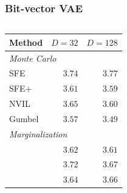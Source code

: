 \documentclass[xetex,aspectratio=169,xcolor,professionalfonts,hyperref]{beamer}
\begin{document}
\begin{frame}[noframenumbering]
    \frametitle{Bit-vector VAE}
    \begin{columns}[T]
        \begin{column}{.53\textwidth}
            \centering\small%
            \begin{tabular}{lrr}
                \toprule
                Method                                    & $D=32$ & $D=128$ \\
                \midrule
                \multicolumn{3}{l}{\emph{Monte Carlo}}                       \\
                SFE                                       & $3.74$ & $3.77$  \\
                SFE$+$                                    & $3.61$ & $3.59$  \\
                NVIL                                      & $3.65$ & $3.60$  \\
                Gumbel                                    & $3.57$ & $3.49$  \\
                \midrule
                \multicolumn{3}{l}{\emph{Marginalization}}                   \\
                \color{tVividBlue}{Top-$k$ sparsemax}     & $3.62$ & $3.61$  \\
                \color{tVividBlue}{SparseMAP}             & $3.72$ & $3.67$  \\
                \color{tVividBlue}{SparseMAP (w/ budget)} & $3.64$ & $3.66$  \\
                \bottomrule
            \end{tabular}
        \end{column}
        \begin{column}{.47\textwidth}
            \centering%
            \only<3>{
                
            }
        \end{column}
    \end{columns}
\end{frame}
\end{document}
